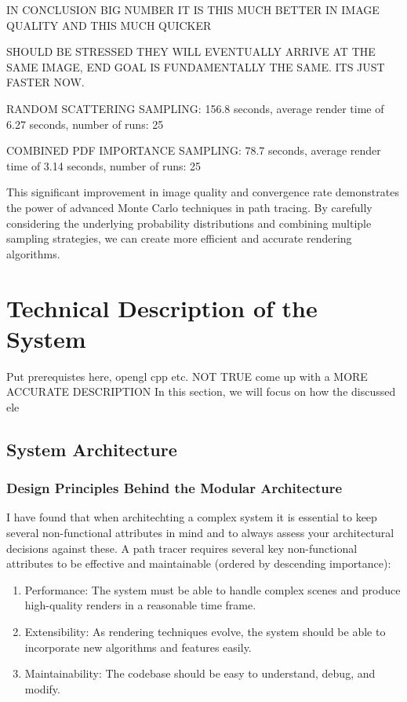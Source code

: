 \documentclass[12pt]{article}
\begin{document}
IN CONCLUSION BIG NUMBER IT IS THIS MUCH BETTER IN IMAGE QUALITY AND THIS MUCH QUICKER


SHOULD BE STRESSED THEY WILL EVENTUALLY ARRIVE AT THE SAME IMAGE, END GOAL IS FUNDAMENTALLY THE SAME. ITS JUST FASTER NOW.

RANDOM SCATTERING SAMPLING:
156.8 seconds, average render time of 6.27 seconds, number of runs: 25

COMBINED PDF IMPORTANCE SAMPLING:
78.7 seconds, average render time of 3.14 seconds, number of runs: 25

This significant improvement in image quality and convergence rate demonstrates the power of advanced Monte Carlo techniques in path tracing. By carefully considering the underlying probability distributions and combining multiple sampling strategies, we can create more efficient and accurate rendering algorithms.

\section{Technical Description of the System}
\label{sec:system-description}

Put prerequistes here, opengl cpp etc.
NOT TRUE come up with a MORE ACCURATE DESCRIPTION
In this section, we will focus on how the discussed ele

\subsection{System Architecture}

\subsubsection{Design Principles Behind the Modular Architecture}

I have found that when architechting a complex system it is essential to keep several non-functional attributes in mind and to always assess your architectural decisions against these.
A path tracer requires several key non-functional attributes to be effective and maintainable (ordered by descending importance):

\begin{enumerate}
    \item Performance: The system must be able to handle complex scenes and produce high-quality renders in a reasonable time frame.
    \item Extensibility: As rendering techniques evolve, the system should be able to incorporate new algorithms and features easily.
    \item Maintainability: The codebase should be easy to understand, debug, and modify.
\end{enumerate}
\end{document}

